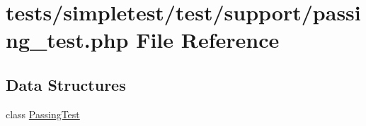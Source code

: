 \hypertarget{passing__test_8php}{\section{tests/simpletest/test/support/passing\-\_\-test.php File Reference}
\label{passing__test_8php}
}
\subsection*{Data Structures}
\begin{DoxyCompactItemize}
\item 
class \hyperlink{class_passing_test}{Passing\-Test}
\end{DoxyCompactItemize}
